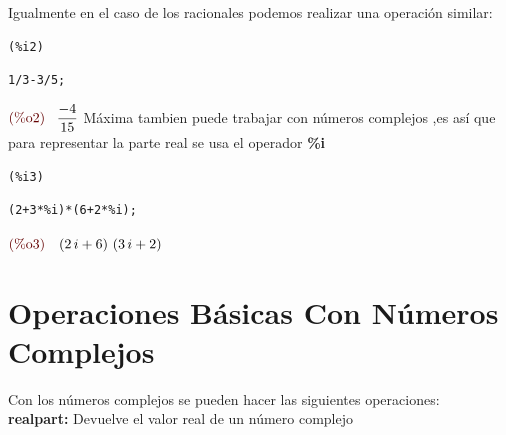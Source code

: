 \documentclass[10pt,a4paper]{book}
\begin{document}
Igualmente en el caso de los racionales podemos realizar una operación similar: \\

\noindent
\begin{minipage}[t]{8ex}{\color{red}\bf
\begin{verbatim}
(%i2) 
\end{verbatim}}
\end{minipage}
\begin{minipage}[t]{\textwidth}{\color{blue}
\begin{verbatim}
1/3-3/5;
\end{verbatim}}
\end{minipage}
\begin{math}\displaystyle
\parbox{8ex}{\color{labelcolor}(\%o2) }
\frac{-4}{15}
\end{math}
Máxima tambien puede trabajar con números complejos ,es así que para representar la parte real se usa el operador \textbf{\%i}

\noindent
\begin{minipage}[t]{8ex}{\color{red}\bf
\begin{verbatim}
(%i3) 
\end{verbatim}}
\end{minipage}
\begin{minipage}[t]{\textwidth}{\color{blue}
\begin{verbatim}
(2+3*%i)*(6+2*%i);
\end{verbatim}}
\end{minipage}
\begin{math}\displaystyle
\parbox{8ex}{\color{labelcolor}(\%o3) }
\left( 2\,i+6\right) \,\left( 3\,i+2\right) 
\end{math}

\section{Operaciones Básicas Con Números Complejos}
Con los números complejos se pueden hacer las siguientes operaciones: \\
\textbf{realpart: } Devuelve el valor real de un número complejo\\
\end{document}
